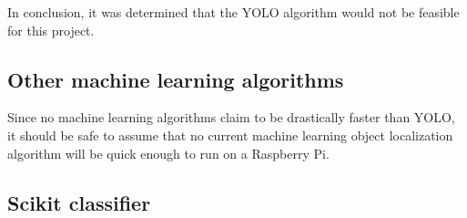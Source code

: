 In conclusion, it was determined that the YOLO algorithm would not be feasible for this project.

\subsection{Other machine learning algorithms}
Since no machine learning algorithms claim to be drastically faster than YOLO, it should be safe to assume that no current machine learning object localization algorithm will be quick enough to run on a Raspberry Pi.

\subsection{Scikit classifier}

